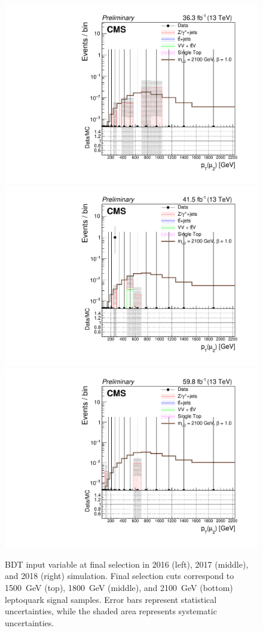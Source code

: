 \begin{figure}[H]
    {\includegraphics[width=.32\textwidth]{Images/Analysis/Results_2016_Unblinded/Plots/Final_selection/BasicLQ_uujj_Pt_muon2_final2100.pdf}}
    {\includegraphics[width=.32\textwidth]{Images/Analysis/Results_2017_Unblinded/Plots/Final_selection/BasicLQ_uujj_Pt_muon2_final2100.pdf}}
    {\includegraphics[width=.32\textwidth]{Images/Analysis/Results_2018_Unblinded/Plots/Final_selection/BasicLQ_uujj_Pt_muon2_final2100.pdf}}
    \caption{BDT input variable \ptof{\PmuTwo} at final selection in 2016 (left), 2017 (middle), and 2018 (right) simulation. Final selection cuts correspond to \SI{1500}{GeV} (top), \SI{1800}{GeV} (middle), and \SI{2100}{GeV} (bottom) leptoquark signal samples. Error bars represent statistical uncertainties, while the shaded area represents systematic uncertainties.
    \label{figapp:finalSelptu2}}
\end{figure}
